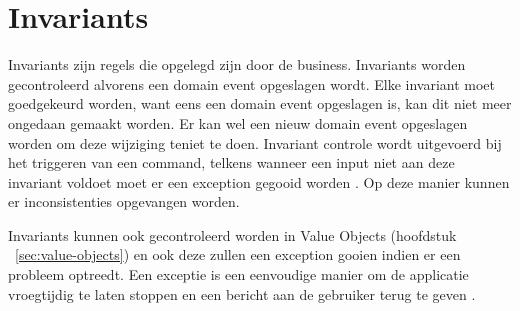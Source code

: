 
\section{Invariants}
\label{sec:invariants}

Invariants zijn regels die opgelegd zijn door de business. Invariants worden gecontroleerd alvorens een domain event opgeslagen wordt. Elke invariant moet goedgekeurd worden, want eens een domain event opgeslagen is, kan dit niet meer ongedaan gemaakt worden. Er kan wel een nieuw domain event opgeslagen worden om deze wijziging teniet te doen. Invariant controle wordt uitgevoerd bij het triggeren van een command, telkens wanneer een input niet aan deze invariant voldoet moet er een exception gegooid worden \autocite{Verraes2015FormCommandModel}. Op deze manier kunnen er inconsistenties opgevangen worden.

Invariants kunnen ook gecontroleerd worden in Value Objects (hoofdstuk ~\ref{sec:value-objects}) en ook deze zullen een exception gooien indien er een probleem optreedt.
Een exceptie is een eenvoudige manier om de applicatie vroegtijdig te laten stoppen en een bericht aan de gebruiker terug te geven \autocite{Verraes2015Messages}.
